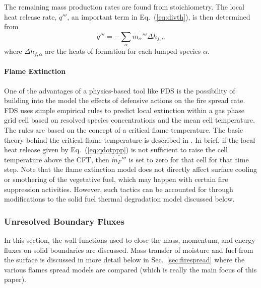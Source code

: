 \documentclass[journal,article,atmosphere,submit,moreauthors,pdftex]{Definitions_Review_Process/mdpi}
\begin{document}
The remaining mass production rates are found from stoichiometry.  The local heat release rate, $\dot{q}'''$, an important term in Eq.~(\ref{eq:divth}), is then determined from
\begin{equation}
\label{eq:qdotppp}
\dot{q}''' = - \sum_\alpha \overline{\dot{m}_\alpha'''} \Delta h_{f,\alpha}
\end{equation}
where $\Delta h_{f,\alpha}$ are the heats of formation for each lumped species $\alpha$.

\paragraph{Flame Extinction} One of the advantages of a physics-based tool like FDS is the possibility of building into the model the effects of defensive actions on the fire spread rate.  FDS uses simple empirical rules to predict local extinction within a gas phase grid cell based on resolved species concentrations and the mean cell temperature. The rules are based on the concept of a critical flame temperature. The basic theory behind the critical flame temperature is described in \cite{SFPE:Beyler}.  In brief, if the local heat release given by Eq.~(\ref{eq:qdotppp}) is not sufficient to raise the cell temperature above the CFT, then $\overline{\dot{m}_{F}'''}$ is set to zero for that cell for that time step.  Note that the flame extinction model does not directly affect surface cooling or smothering of the vegetative fuel, which may happen with certain fire suppression activities.  However, such tactics can be accounted for through modifications to the solid fuel thermal degradation model discussed below.

\subsubsection{Unresolved Boundary Fluxes}
\label{sec:boundflx}
In this section, the wall functions used to close the mass, momentum, and energy fluxes on solid boundaries are discussed.  Mass transfer of moisture and fuel from the surface is discussed in more detail below in Sec.~\ref{sec:firespread} where the various flames spread models are compared (which is really the main focus of this paper).
\end{document}
